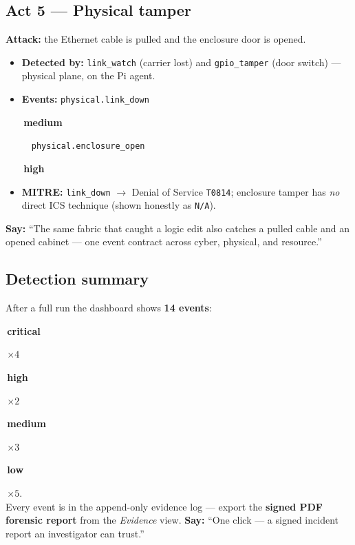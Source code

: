 \documentclass[11pt,a4paper]{article}
\newcommand{\code}[1]{\texttt{\small #1}}
\newcommand{\sev}[2]{\colorbox{#1}{\small\strut\,#2\,}}
\newcommand{\crit}{\sev{critbg}{\color{critical}\textbf{critical}}}
\newcommand{\high}{\sev{highbg}{\color{serious}\textbf{high}}}
\newcommand{\med}{\sev{medbg}{\color{warn}\textbf{medium}}}
\newcommand{\low}{\sev{lowbg}{\color{muted}\textbf{low}}}
\begin{document}
\subsection{Act 5 --- Physical tamper}
\textbf{Attack:} the Ethernet cable is pulled and the enclosure door is opened.
\begin{itemize}[leftmargin=1.3em,itemsep=1pt]
  \item \textbf{Detected by:} \code{link\_watch} (carrier lost) and \code{gpio\_tamper}
        (door switch) --- physical plane, on the Pi agent.
  \item \textbf{Events:} \code{physical.link\_down} \med\ \textbullet\ \code{physical.enclosure\_open} \high
  \item \textbf{MITRE:} \code{link\_down} $\rightarrow$ Denial of Service \code{T0814};
        enclosure tamper has \emph{no} direct ICS technique (shown honestly as \code{N/A}).
\end{itemize}
\begin{say}\textbf{Say:} ``The same fabric that caught a logic edit also catches a pulled
cable and an opened cabinet --- one event contract across cyber, physical, and resource.''\end{say}

\subsection{Detection summary}
\begin{note}
After a full run the dashboard shows \textbf{14 events}:
\quad\crit\,$\times4$ \quad \high\,$\times2$ \quad \med\,$\times3$ \quad \low\,$\times5$.\\
Every event is in the append-only evidence log --- export the \textbf{signed PDF forensic
report} from the \emph{Evidence} view. \textbf{Say:} ``One click --- a signed incident
report an investigator can trust.''
\end{note}

\end{document}
